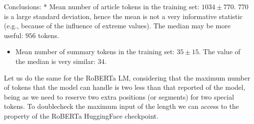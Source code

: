 \documentclass[letterpaper,10pt,english]{sphinxmanual}
\begin{document}
\sphinxAtStartPar
Conclusions: * Mean number of article tokens in the training set: \(1034\pm770\). 770 is a large standard deviation, hence the mean is not a very informative statistic (e.g., because of the influence of extreme values). The median may be more useful: \(956\) tokens.
\begin{itemize}
\item {} 
\sphinxAtStartPar
Mean number of summary tokens in the training set: \(35\pm15\). The value of the median is very similar: \(34\).

\end{itemize}

\sphinxAtStartPar
Let us do the same for the RoBERTa LM, considering that the maximum number of tokens that the model can handle is two less than that reported of the model, being as we need to reserve two extra positions (or segments) for two special tokens. To double\sphinxhyphen{}check the maximum input of the length we can access to the  property of the RoBERTa HuggingFace checkpoint.
\end{document}
